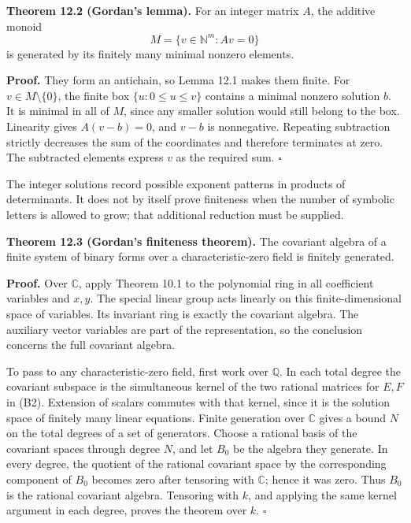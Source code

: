 \documentclass[
]{article}
\begin{document}
\protect{}\label{theorem-12-2}{}

\textbf{Theorem 12.2 (Gordan's lemma).} For an integer matrix \(A\), the
additive monoid \[
M=\{v\in\mathbb N^m:Av=0\}
\] is generated by its finitely many minimal nonzero elements.

\textbf{Proof.} They form an antichain, so Lemma 12.1 makes them finite.
For \(v\in M\setminus\{0\}\), the finite box \(\{u:0\leq u\leq v\}\)
contains a minimal nonzero solution \(b\). It is minimal in all of
\(M\), since any smaller solution would still belong to the box.
Linearity gives \(A(v-b)=0\), and \(v-b\) is nonnegative. Repeating
subtraction strictly decreases the sum of the coordinates and therefore
terminates at zero. The subtracted elements express \(v\) as the
required sum. \(\square\)

The integer solutions record possible exponent patterns in products of
determinants. It does not by itself prove finiteness when the number of
symbolic letters is allowed to grow; that additional reduction must be
supplied.

\protect{}\label{theorem-12-3}{}

\textbf{Theorem 12.3 (Gordan's finiteness theorem).} The covariant
algebra of a finite system of binary forms over a characteristic-zero
field is finitely generated.

\textbf{Proof.} Over \(\mathbb C\), apply Theorem 10.1 to the polynomial
ring in all coefficient variables and \(x,y\). The special linear group
acts linearly on this finite-dimensional space of variables. Its
invariant ring is exactly the covariant algebra. The auxiliary vector
variables are part of the representation, so the conclusion concerns the
full covariant algebra.

To pass to any characteristic-zero field, first work over \(\mathbb Q\).
In each total degree the covariant subspace is the simultaneous kernel
of the two rational matrices for \(E,F\) in (B2). Extension of scalars
commutes with that kernel, since it is the solution space of finitely
many linear equations. Finite generation over \(\mathbb C\) gives a
bound \(N\) on the total degrees of a set of generators. Choose a
rational basis of the covariant spaces through degree \(N\), and let
\(B_0\) be the algebra they generate. In every degree, the quotient of
the rational covariant space by the corresponding component of \(B_0\)
becomes zero after tensoring with \(\mathbb C\); hence it was zero. Thus
\(B_0\) is the rational covariant algebra. Tensoring with \(k\), and
applying the same kernel argument in each degree, proves the theorem
over \(k\). \(\square\)
\end{document}
